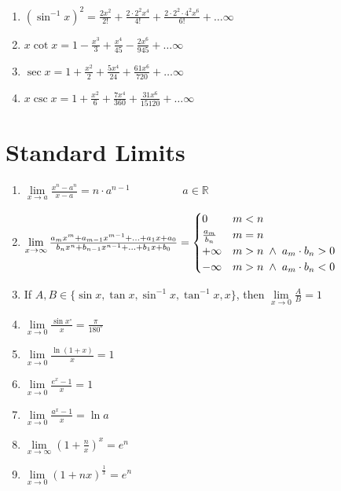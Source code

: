 \documentclass{article}
\begin{document}
\begin{enumerate}
    \item $\left(\sin^{-1} x\right)^2=\frac{2x^2}{2!}+\frac{2 \cdot 2^2x^4}{4!}+\frac{2\cdot2^2\cdot4^2x^6}{6!}+\ldots \infty$

    \item $x\cot x= 1-\frac{x^3}{3}+\frac{x^4}{45}-\frac{2x^6}{945}+\ldots \infty$

    \item $\sec x= 1+\frac{x^2}{2}+\frac{5x^4}{24}+\frac{61x^6}{720}+\ldots \infty$

    \item $x \csc x= 1 + \frac{x^2}{6}+\frac{7x^4}{360}+\frac{31x^6}{15120}+\ldots \infty$
    
\end{enumerate}

\section{Standard Limits}
\begin{enumerate}
    \item $\lim\limits_{x\to a}{\frac{x^n-a^n}{x-a}}=n\cdot a^{n-1} \hspace{2cm} a \in \mathbb{R}$
    \item $\lim\limits_{x \to \infty}{\frac{a_{m}x^m+a_{m-1}x^{m-1}+\ldots +a_{1}x+a_{0}}{b_{n}x^n+b_{n-1}x^{n-1}+\ldots +b_{1}x+b_{0}}}=
    \begin{cases}
        0 & m<n \\
        \frac{a_{m}}{b_{n}} & m=n \\
        +\infty & m>n \hspace{1mm} \land \hspace{1mm}a_{m}\cdot b_{n}>0 \\
        -\infty & m>n \hspace{1mm} \land \hspace{1mm} a_{m}\cdot b_{n}<0
    \end{cases}$

    \item If $A,B \in \{\sin x, \tan x,\sin^{-1} x, \tan^{-1} x, x\}$, \newline \newline then $\lim\limits_{x \to 0}{\frac{A}{B}}=1$
    \item $\lim\limits_{x \to 0}{\frac{\sin x^\circ}{x}}=\frac{\pi}{180^\circ}$
    \item $\lim\limits_{x \to 0}{\frac{\ln \left(1+x\right)}{x}}=1$

    \item $\lim\limits_{x \to 0}{\frac{e^x-1}{x}}=1$
    \item $\lim\limits_{x \to 0}{\frac{a^x-1}{x}=\ln a}$
    \item $\lim\limits_{x \to \infty}{\left(1+\frac{n}{x}\right)^x}=e^n$
    \item $\lim\limits_{x \to 0}{\left(1+nx\right)^\frac{1}{x}}=e^n$
\end{enumerate}
\end{document}
